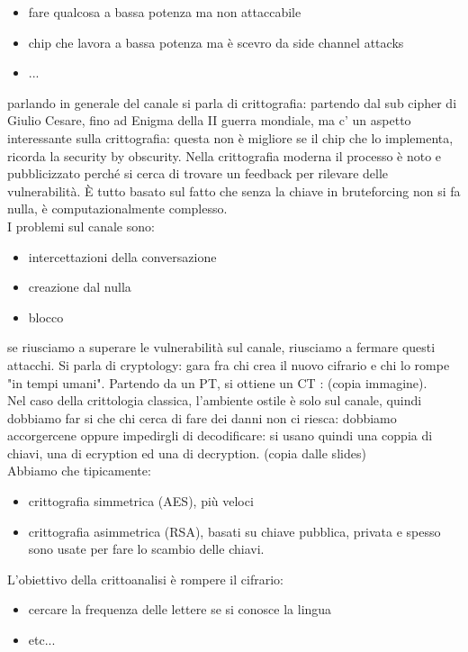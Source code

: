 \documentclass[oneside, 12pt]{extbook}
\begin{document}
\begin{itemize}
	\item fare qualcosa a bassa potenza ma non attaccabile
	\item chip che lavora a bassa potenza ma è scevro da side channel attacks
	\item ...
\end{itemize}
parlando in generale del canale si parla di crittografia: partendo dal sub cipher di Giulio Cesare, fino ad Enigma della II guerra mondiale, ma c' un aspetto interessante sulla crittografia: questa non è migliore se il chip che lo implementa, ricorda la security by obscurity. Nella crittografia moderna il processo è noto e pubblicizzato perché si cerca di trovare un feedback per rilevare delle vulnerabilità. È tutto basato sul fatto che senza la chiave in bruteforcing non si fa nulla, è computazionalmente complesso.\\I problemi sul canale sono:
\begin{itemize}
	\item  intercettazioni della conversazione
	\item creazione dal nulla
	\item blocco
\end{itemize}
se riusciamo a superare le vulnerabilità sul canale, riusciamo a fermare questi attacchi. Si parla di cryptology: gara fra chi crea il nuovo cifrario e chi lo rompe "in tempi umani". Partendo da un PT, si ottiene un CT : (copia immagine).\\Nel caso della crittologia classica, l'ambiente ostile è solo sul canale, quindi dobbiamo far si che chi cerca di fare dei danni non ci riesca: dobbiamo accorgercene oppure impedirgli di decodificare: si usano quindi una coppia di chiavi, una di ecryption ed una di decryption. (copia dalle slides)\\Abbiamo che tipicamente:
\begin{itemize}
	\item crittografia simmetrica (AES), più veloci
	\item crittografia asimmetrica (RSA), basati su chiave pubblica, privata e spesso sono usate per fare lo scambio delle chiavi.
\end{itemize}
L'obiettivo della crittoanalisi è rompere il cifrario:
\begin{itemize}
	\item  cercare la frequenza delle lettere se si conosce la lingua
	\item etc...
\end{itemize}
\end{document}
